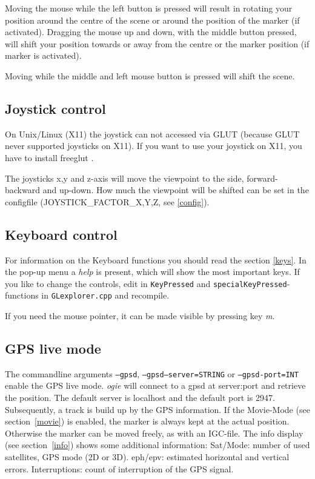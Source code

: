 Moving the mouse while the left button is pressed will result in rotating your position around the centre of the scene or around
the position of the marker (if activated). Dragging the mouse up and down, with the middle button pressed, will shift your
position towards or away from the centre or the marker position (if marker is activated).


Moving while the middle and left mouse button is pressed will shift the scene.


\subsection{Joystick control}
On Unix/Linux (X11) the joystick can not accessed via GLUT (because
GLUT never supported joysticks on X11). If you want to use your joystick on X11, you have to install freeglut \cite{freeglut}.

The joysticks x,y and z-axis will move the viewpoint to the side, forward-backward and up-down. How much the viewpoint
will be shifted can be set in the configfile (JOYSTICK\_FACTOR\_X,Y,Z, see \ref{config}).

\subsection{Keyboard control}
For information on the Keyboard functions you should read the section \ref{keys}.
In the pop-up menu a \emph{help} is present, which will show the most important keys.
If you like to change the controls, edit in \texttt{KeyPressed} and \texttt{specialKeyPressed}-functions in
\texttt{GLexplorer.cpp} and recompile.

If you need the mouse pointer, it can be made visible by pressing key \emph{m}.


\subsection{GPS live mode}
\label{gps}

The commandline arguments \texttt{--gpsd}, \texttt{--gpsd--server=STRING} or \texttt{--gpsd-port=INT} enable the GPS live mode.
\emph{ogie} will connect to a gpsd at server:port and retrieve the position.
The default server is localhost and the default port is 2947.
Subsequently, a track is build up by the GPS information.
If the Movie-Mode (see section~\ref{movie}) is enabled, the marker is always kept at the actual position.
Otherwise the marker can be moved freely, as with an IGC-file.
The info display (see section~\ref{info}) shows some additional information:
Sat/Mode: number of used satellites, GPS mode (2D or 3D). eph/epv: estimated horizontal and vertical errors. Interruptions: count of interruption of the GPS signal.

